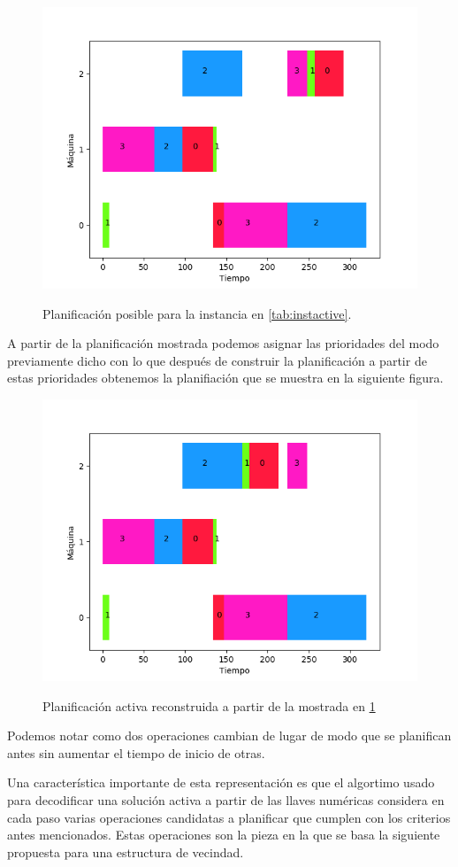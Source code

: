 \begin{figure}[H]
     \centering
     \includegraphics[scale=.7]{Imagenes/ganttnonactivepr.png}
     \label{fig:nonactivepr}
     \caption{Planificación posible para la instancia en \ref{tab:instactive}. }
\end{figure}
A partir de la planificación mostrada podemos asignar las prioridades del modo previamente dicho con lo que después de construir la planificación a partir de estas prioridades obtenemos la planifiación que se muestra en la siguiente figura.
\begin{figure}[H]
     \centering
     \includegraphics[scale=.7]{Imagenes/ganttactivepr.png}
     \label{fig:activepr}
     \caption{Planificación activa reconstruida a partir de la mostrada en \ref{fig:nonactivepr}}
\end{figure}

Podemos notar como dos operaciones cambian de lugar de modo que se planifican antes sin aumentar el tiempo de inicio de otras.

Una característica importante de esta representación es que el algortimo usado para decodificar una solución activa a partir de las llaves numéricas considera en cada paso varias operaciones candidatas a planificar que cumplen con los criterios antes mencionados. Estas operaciones son la pieza en la que se basa la siguiente propuesta para una estructura de vecindad.
